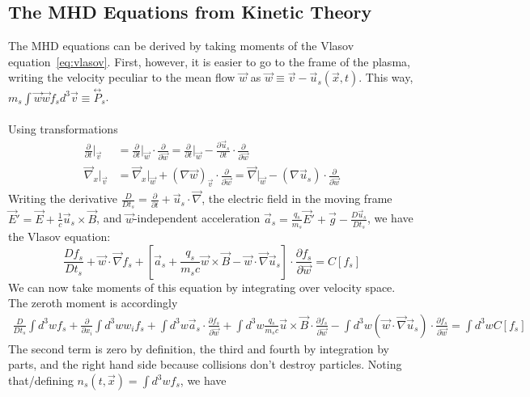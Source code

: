 \subsection{The MHD Equations from Kinetic Theory} \label{ssec:mhdKin}
The MHD equations can be derived by taking moments of the Vlasov equation~\ref{eq:vlasov}. First, however, it is easier to go to the frame of the plasma, writing the velocity peculiar to the mean flow $\vec w$ as $\vec w\equiv\vec v-\vec u_s(\vec x,t)$. This way, $m_s\int\vec w\vec w f_sd^3\vec v\equiv\overset{\leftrightarrow}{P}_s$.\\
\\
Using transformations
\begin{align*}
  \frac{\partial}{\partial t}\vert_{\vec v}&=\frac{\partial}{\partial t}\vert_{\vec w}\cdot\frac{\partial}{\partial \vec w}=\frac{\partial}{\partial t}\vert_{\vec w}-\frac{\partial\vec u_s}{\partial t}\cdot\frac\partial{\partial\vec w}\\
  \vec\nabla_x\vert_{\vec v}&=\vec\nabla_x\vert_{\vec w}+(\nabla\vec w)_{\vec v}\cdot\frac{\partial}{\partial\vec w}=\vec\nabla\vert_{\vec w}-(\nabla\vec u_s)\cdot\frac{\partial}{\partial\vec w}
\end{align*}
Writing the derivative $\frac{D}{Dt_s}=\frac{\partial}{\partial t}+\vec u_s\cdot\vec\nabla$, the electric field in the moving frame $\vec E'=\vec E+\frac1c\vec u_s\times\vec B$, and $\vec w$-independent acceleration $\vec a_s=\frac{q_s}{m_s}\vec E'+\vec g-\frac{D\vec u_s}{Dt_s}$, we have the Vlasov equation:
\begin{equation}
  \frac{Df_s}{Dt_s}+\vec w\cdot\vec\nabla f_s+\left[\vec a_s+\frac{q_s}{m_sc}\vec w\times\vec B-\vec w\cdot\vec\nabla\vec u_s\right]\cdot\frac{\partial f_s}{\partial\vec w}=C[f_s]\label{eq:vlasov2}
\end{equation}
We can now take moments of this equation by integrating over velocity space. The zeroth moment is accordingly
\begin{align*}
  \frac{D}{Dt_s}\int d^3wf_s+\frac{\partial}{\partial x_i}\int d^3ww_if_s+\int d^3w\vec a_s\cdot\frac{\partial f_s}{\partial\vec w}+\int d^3w\frac{q_s}{m_sc}\vec u\times\vec B\cdot\frac{\partial f_s}{\partial\vec w}-\int d^3w(\vec w\cdot\vec\nabla\vec u_s)\cdot\frac{\partial f_s}{\partial\vec w}=\int d^3w C[f_s]
\end{align*}
The second term is zero by definition, the third and fourth by integration by parts, and the right hand side because collisions don't destroy particles. Noting that/defining $n_s(t,\vec x)=\int d^3w f_s$, we have
